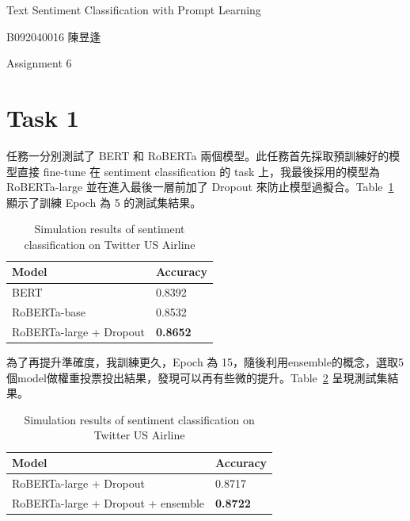\documentclass[a4paper,12pt]{article}   %
\begin{document}

\begin{center}
	{\fontsize{16pt}{12pt}\selectfont Text Sentiment Classification with Prompt Learning}
	
\end{center}

\hfill  B092040016 陳昱逢
	
	
\begin{center}
	Assignment 6
\end{center}

\section{Task 1}
	任務一分別測試了 BERT 和 RoBERTa 兩個模型。此任務首先採取預訓練好的模型直接 fine-tune 在 sentiment classification 的 task 上，我最後採用的模型為 RoBERTa-large 並在進入最後一層前加了 Dropout 來防止模型過擬合。Table\ \ref{table:comparison_task1} 顯示了訓練 Epoch 為 5 的測試集結果。
	
\begin{table}[htb]
	\centering	
	\normalsize
    \caption{Simulation results of sentiment classification on Twitter US Airline}
    \vspace{0.15\baselineskip}
    \begin{tabularx}{1\textwidth}{@{}XX@{}}
		\toprule
		\textbf{Model} & \textbf{Accuracy} \\
		\midrule
		BERT     &  0.8392  \\ 
		RoBERTa-base  & 0.8532 \\
		RoBERTa-large + Dropout & \textbf{0.8652} \\
		\bottomrule
	\end{tabularx}
	\label{table:comparison_task1}
    \vspace{0.15\baselineskip}
\end{table}

為了再提升準確度，我訓練更久，Epoch 為 15，隨後利用ensemble的概念，選取5個model做權重投票投出結果，發現可以再有些微的提升。Table\ \ref{table:comparison_task1_2} 呈現測試集結果。

\begin{table}[htb]
	\centering	
	\normalsize
    \caption{Simulation results of sentiment classification on Twitter US Airline}
    \vspace{0.15\baselineskip}
    \begin{tabularx}{1\textwidth}{@{}XX@{}}
		\toprule
		\textbf{Model} & \textbf{Accuracy} \\
		\midrule
		RoBERTa-large + Dropout & 0.8717 \\
		RoBERTa-large + Dropout + ensemble & \textbf{0.8722} \\
		\bottomrule
	\end{tabularx}
	\label{table:comparison_task1_2}
    \vspace{0.15\baselineskip}
\end{table}
\end{document}
